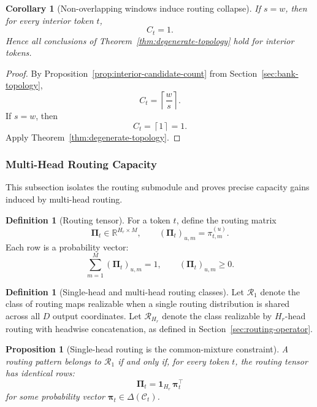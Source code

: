 \documentclass{article}
\theoremstyle{plain}
\newtheorem{proposition}[theorem]{Proposition}
\newtheorem{corollary}[theorem]{Corollary}
\theoremstyle{definition}
\newtheorem{definition}[theorem]{Definition}
\theoremstyle{remark}
\begin{document}
\begin{corollary}[Non-overlapping windows induce routing collapse]
\label{cor:stride-equals-window}
If $s=w$, then for every interior token $t$,
\[
C_{t}=1.
\]
Hence all conclusions of Theorem~\ref{thm:degenerate-topology} hold for interior tokens.
\end{corollary}

\begin{proof}
By Proposition~\ref{prop:interior-candidate-count} from Section~\ref{sec:bank-topology},
\[
C_{t}
=
\left\lceil \frac{w}{s}\right\rceil.
\]
If $s=w$, then
\[
C_{t}=\left\lceil 1\right\rceil=1.
\]
Apply Theorem~\ref{thm:degenerate-topology}.
\end{proof}

\subsubsection{Multi-Head Routing Capacity}
\label{sec:tier-a-multihead-capacity}

This subsection isolates the routing submodule and proves precise capacity gains induced by multi-head routing.

\begin{definition}[Routing tensor]
\label{def:routing-tensor}
For a token $t$, define the routing matrix
\[
\boldsymbol{\Pi}_{t} \in \mathbb{R}^{H_r \times M},
\qquad
(\boldsymbol{\Pi}_{t})_{u,m} = \pi^{(u)}_{t,m}.
\]
Each row is a probability vector:
\[
\sum_{m=1}^{M} (\boldsymbol{\Pi}_{t})_{u,m}=1,
\qquad
(\boldsymbol{\Pi}_{t})_{u,m}\ge 0.
\]
\end{definition}

\begin{definition}[Single-head and multi-head routing classes]
\label{def:routing-classes}
Let $\mathcal{R}_1$ denote the class of routing maps realizable when a single routing distribution is shared across all $D$ output coordinates. Let $\mathcal{R}_{H_r}$ denote the class realizable by $H_r$-head routing with headwise concatenation, as defined in Section~\ref{sec:routing-operator}.
\end{definition}

\begin{proposition}[Single-head routing is the common-mixture constraint]
\label{prop:single-head-common-mixture}
A routing pattern belongs to $\mathcal{R}_1$ if and only if, for every token $t$, the routing tensor has identical rows:
\begin{equation}
\label{eq:single-head-common-mixture}
\boldsymbol{\Pi}_{t}
=
\mathbf{1}_{H_r}\,\boldsymbol{\pi}_{t}^{\top}
\end{equation}
for some probability vector $\boldsymbol{\pi}_{t}\in \Delta(\mathcal C_t)$.
\end{proposition}
\end{document}

